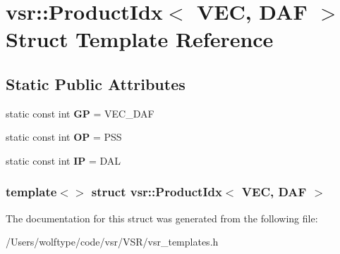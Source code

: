 \hypertarget{structvsr_1_1_product_idx_3_01_v_e_c_00_01_d_a_f_01_4}{\section{vsr\-:\-:Product\-Idx$<$ V\-E\-C, D\-A\-F $>$ Struct Template Reference}
\label{structvsr_1_1_product_idx_3_01_v_e_c_00_01_d_a_f_01_4}
}
\subsection*{Static Public Attributes}
\begin{DoxyCompactItemize}
\item 
\hypertarget{structvsr_1_1_product_idx_3_01_v_e_c_00_01_d_a_f_01_4_abde870214a44783c098878f216a07ba8}{static const int {\bfseries G\-P} = V\-E\-C\-\_\-\-D\-A\-F}\label{structvsr_1_1_product_idx_3_01_v_e_c_00_01_d_a_f_01_4_abde870214a44783c098878f216a07ba8}

\item 
\hypertarget{structvsr_1_1_product_idx_3_01_v_e_c_00_01_d_a_f_01_4_a93e4ec7329094802f7846962a488adce}{static const int {\bfseries O\-P} = P\-S\-S}\label{structvsr_1_1_product_idx_3_01_v_e_c_00_01_d_a_f_01_4_a93e4ec7329094802f7846962a488adce}

\item 
\hypertarget{structvsr_1_1_product_idx_3_01_v_e_c_00_01_d_a_f_01_4_a66e82ece9cd9c800af8aca48a4ef45be}{static const int {\bfseries I\-P} = D\-A\-L}\label{structvsr_1_1_product_idx_3_01_v_e_c_00_01_d_a_f_01_4_a66e82ece9cd9c800af8aca48a4ef45be}

\end{DoxyCompactItemize}
\subsubsection*{template$<$$>$ struct vsr\-::\-Product\-Idx$<$ V\-E\-C, D\-A\-F $>$}



The documentation for this struct was generated from the following file\-:\begin{DoxyCompactItemize}
\item 
/\-Users/wolftype/code/vsr/\-V\-S\-R/vsr\-\_\-templates.\-h\end{DoxyCompactItemize}
